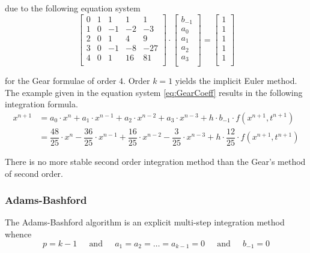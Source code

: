 \documentclass[10pt]{report}
\begin{document}
due to the following equation system
\begin{equation}
\label{eq:GearCoeff}
\left[\begin{array}{lrrrr}
0 & 1 &  1 &  1 &   1\\
1 & 0 & -1 & -2 &  -3\\
2 & 0 &  1 &  4 &   9\\
3 & 0 & -1 & -8 & -27\\
4 & 0 &  1 & 16 &  81\\
\end{array}\right]
\cdot
\begin{bmatrix}
b_{-1}\\
a_0\\
a_1\\
a_2\\
a_3\\
\end{bmatrix}
=
\begin{bmatrix}
1\\
1\\
1\\
1\\
1\\
\end{bmatrix}
\end{equation}

for the Gear formulae of order $4$.  Order $k = 1$ yields the implicit
Euler method.  The example given in the equation system
\eqref{eq:GearCoeff} results in the following integration formula.
\begin{equation}
\label{eq:GearInt}
\begin{split}
x^{n+1} &= a_0\cdot x^{n} + a_1\cdot x^{n-1} + a_2\cdot x^{n-2} + a_3\cdot x^{n-3} + h\cdot b_{-1}\cdot f(x^{n+1}, t^{n+1})\\
&= \dfrac{48}{25}\cdot x^{n} - \dfrac{36}{25}\cdot x^{n-1} + \dfrac{16}{25}\cdot x^{n-2} - \dfrac{3}{25}\cdot x^{n-3} + h\cdot \dfrac{12}{25}\cdot f(x^{n+1}, t^{n+1})
\end{split}
\end{equation}

There is no more stable second order integration method than the
Gear's method of second order.

\subsubsection{Adams-Bashford}

The Adams-Bashford algorithm is an explicit multi-step integration
method whence
\begin{equation}
p = k - 1
\;\;\;\; \textrm{ and } \;\;\;\;
a_1 = a_2 = \ldots = a_{k-1} = 0
\;\;\;\; \textrm{ and } \;\;\;\;
b_{-1} = 0
\end{equation}
\end{document}
